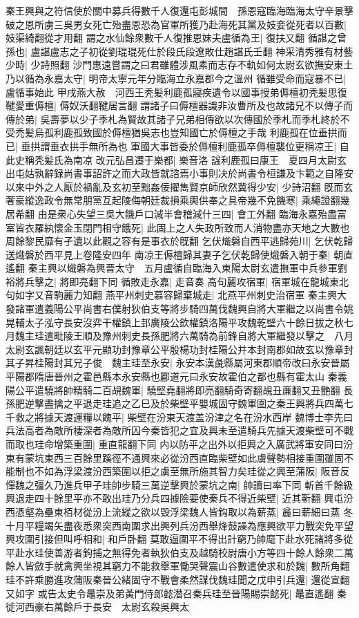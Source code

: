 秦王興與之符信使於關中募兵得數千人復還屯彭城間　孫恩寇臨海臨海太守辛景擊破之恩所虜三吳男女死亡殆盡恩恐為官軍所獲乃赴海死其黨及妓妾從死者以百數|{
	妓渠綺翻從才用翻}
謂之水仙餘衆數千人復推恩妹夫盧循為王|{
	復扶又翻}
循諶之曾孫也|{
	盧諶盧志之子初從劉琨琨死仕於段氏段遼敗仕趙諶氏壬翻}
神采清秀雅有材藝少時|{
	少詩照翻}
沙門惠遠嘗謂之曰君雖體涉風素而志存不軌如何太尉玄欲撫安東土乃以循為永嘉太守|{
	明帝太寧元年分臨海立永嘉郡今之溫州}
循雖受命而寇暴不已|{
	盧循事始此}
甲戌燕大赦　河西王秃髪利鹿孤寢疾遺令以國事授弟傉檀初秃髪思復鞬愛重傉檀|{
	傉奴沃翻鞬居言翻}
謂諸子曰傉檀器識非汝曹所及也故諸兄不以傳子而傳於弟|{
	吳壽夢以少子季札為賢故其諸子兄弟相傳欲以次傳國於季札而季札終於不受禿髪烏孤利鹿孤致國於傉檀猶吳志也豈知國亡於傉檀之手哉}
利鹿孤在位垂拱而已|{
	垂拱謂垂衣拱手無所為也}
軍國大事皆委於傉檀利鹿孤卒傉檀襲位更稱凉王|{
	自此史稱秃髪氏為南凉}
改元弘昌遷于樂都|{
	樂音洛}
諡利鹿孤曰康王　夏四月太尉玄出屯姑孰辭録尚書事詔許之而大政皆就諮焉小事則决於尚書令桓謙及卞範之自隆安以來中外之人厭於禍亂及玄初至黜姦佞擢雋賢京師欣然冀得少安|{
	少詩沼翻}
旣而玄奢豪縱逸政令無常朋黨互起陵侮朝廷裁損乘輿供奉之具帝幾不免饑寒|{
	乘繩證翻幾居希翻}
由是衆心失望三吳大饑戶口減半會稽減什三四|{
	會工外翻}
臨海永嘉殆盡富室皆衣羅紈懷金玉閉門相守餓死|{
	此固上之人失政所致而人消物盡亦天地之大數也周餘黎民靡有孑遺以此觀之容有是事衣於旣翻}
乞伏熾磐自西平逃歸苑川|{
	乞伏乾歸送熾磐於西平見上卷隆安四年}
南凉王傉檀歸其妻子乞伏乾歸使熾磐入朝于秦|{
	朝直遙翻}
秦主興以熾磐為興晉太守　五月盧循自臨海入東陽太尉玄遣撫軍中兵參軍劉裕將兵擊之|{
	將即亮翻下同}
循敗走永嘉|{
	走音奏}
高句麗攻宿軍|{
	宿軍城在龍城東北句如字又音駒麗力知翻}
燕平州刺史慕容歸棄城走|{
	北燕平州刺史治宿軍}
秦主興大發諸軍遣義陽公平尚書右僕射狄伯支等將步騎四萬伐魏興自將大軍繼之以尚書令姚晃輔太子泓守長安沒弈干權鎮上邽廣陵公欽權鎮洛陽平攻魏乾壁六十餘日拔之秋七月魏主珪遣毗陵王順及豫州刺史長孫肥將六萬騎為前鋒自將大軍繼發以擊之　八月太尉玄諷朝廷以玄平元顯功封豫章公平殷楊功封桂陽公并本封南郡如故玄以豫章封其子昇桂陽封其兄子俊　魏主珪至永安|{
	永安本漢彘縣屬河東郡順帝改曰永安晉屬平陽郡隋唐晉州之霍邑縣本永安縣也酈道元曰永安故霍伯之都也縣有霍太山}
秦義陽公平遣驍將帥精騎二百覘魏軍|{
	驍堅堯翻將即亮翻騎奇寄翻覘丑亷翻又丑艶翻}
長孫肥逆擊盡擒之平退走珪追之乙巳及於柴壁平嬰城固守魏軍圍之秦王興將兵四萬七千救之將據天渡運糧以餽平|{
	柴壁在汾東天渡盖汾津之名在汾水西岸}
魏博士李先曰兵法高者為敵所棲深者為敵所囚今秦皆犯之宜及興未至遣騎兵先據天渡柴壁可不戰而取也珪命增築重圍|{
	重直龍翻下同}
内以防平之出外以拒興之入廣武將軍安同曰汾東有蒙坑東西三百餘里蹊徑不通興來必從汾西直臨柴壁如此虜聲勢相接重圍雖固不能制也不如為浮梁渡汾西築圍以拒之虜至無所施其智力矣珪從之興至蒲阪|{
	阪音反}
憚魏之彊久乃進兵甲子珪帥步騎三萬逆擊興於蒙坑之南|{
	帥讀曰率下同}
斬首千餘級興退走四十餘里平亦不敢出珪乃分兵四據險要使秦兵不得近柴壁|{
	近其靳翻}
興屯汾西憑壑為壘東栢材從汾上流縱之欲以毁浮梁魏人皆鈎取以為薪蒸|{
	麄曰薪細曰蒸}
冬十月平糧竭矢盡夜悉衆突西南圍求出興列兵汾西舉烽鼓譟為應興欲平力戰突免平望興攻圍引接但叫呼相和|{
	和戶卧翻}
莫敢逼圍平不得出計窮乃帥麾下赴水死諸將多從平赴水珪使善游者鉤捕之無得免者執狄伯支及越騎校尉唐小方等四十餘人餘衆二萬餘人皆斂手就禽興坐視其窮力不能救舉軍慟哭聲震山谷數遣使求和於魏|{
	數所角翻}
珪不許乘勝進攻蒲阪秦晉公緒固守不戰會柔然謀伐魏珪聞之戊申引兵還|{
	還從宣翻又如字}
或告太史令鼂崇及弟黃門侍郎懿潜召秦兵珪至晉陽賜崇懿死|{
	鼂直遙翻}
秦徙河西豪右萬餘戶于長安　太尉玄殺吳興太

